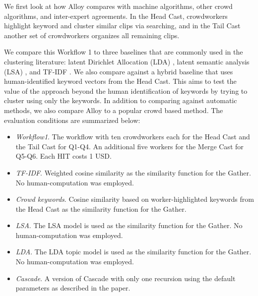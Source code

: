 

We first look at how Alloy compares with
machine algorithms, other crowd algorithms, and inter-expert agreements.  In
the Head Cast, crowdworkers highlight keyword and cluster similar clips via
searching, and in the Tail Cast another set of crowdworkers organizes all remaining clips.

We compare this Workflow 1 to three baselines that are commonly used in the
clustering literature: latent Dirichlet Allocation (LDA) \cite{blei2003latent},
latent semantic analysis (LSA) \cite{deerwester1990indexing}, and TF-IDF
\cite{manning2008introduction,Jones72astatistical}. We also compare against a
hybrid baseline that uses human-identified keyword vectors from the Head Cast.  This aims to test the value of the approach beyond the human identification of keywords by trying to cluster using only the keywords.
In addition to comparing against automatic methods, we also
compare Alloy to a popular crowd based method.
The evaluation conditions are summarized below:

\begin{itemize}
    \setlength\itemsep{0.0em}

	\item \emph{Workflow1}. The workflow with ten crowdworkers each for
		the Head Cast and the Tail Cast for Q1-Q4. An additional five workers for the Merge Cast for Q5-Q6. Each HIT costs 1 USD.
	\item \emph{TF-IDF}. Weighted cosine similarity as the
		similarity function for the Gather.
		No human-computation was employed.
	\item \emph{Crowd keywords}. Cosine similarity based on worker-highlighted keywords from the Head Cast as the
		similarity function for the Gather.
	\item \emph{LSA}. The LSA model is used as the similarity function for
		the Gather.  No human-computation was employed.
	\item \emph{LDA}. The LDA topic model is used as the similarity function
		for the Gather.  No human-computation was employed.
	\item \emph{Cascade}. A version of Cascade with only one recursion 
    	using the default parameters as described in the paper.
        
\end{itemize}


